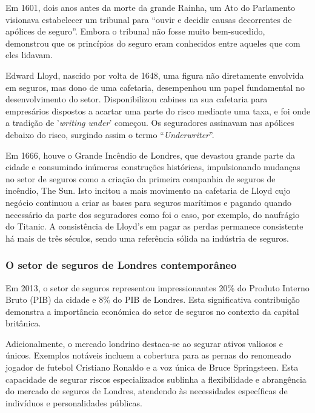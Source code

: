             Em 1601, dois anos antes da morte da grande Rainha, um Ato do Parlamento visionava estabelecer um tribunal para ``ouvir e decidir causas decorrentes de apólices de seguro''. Embora o tribunal não fosse muito bem-sucedido, demonstrou que os princípios do seguro eram conhecidos entre aqueles que com eles lidavam.
            
            Edward Lloyd, nascido por volta de 1648, uma figura não diretamente envolvida em seguros, mas dono de uma cafetaria, desempenhou um papel fundamental no desenvolvimento do setor. Disponibilizou cabines na sua cafetaria para empresários dispostos a acartar uma parte do risco mediante uma taxa, e foi onde a tradição de '\textit{writing under}' começou. Os seguradores assinavam nas apólices debaixo do risco, surgindo assim o termo ``\textit{Underwriter}''.
        
            Em 1666, houve o Grande Incêndio de Londres, que devastou grande parte da cidade e consumindo inúmeras construções históricas, impulsionando mudanças no setor de seguros como a criação da primeira companhia de seguros de incêndio, The Sun. Isto incitou a mais movimento na cafetaria de Lloyd cujo negócio continuou a criar as bases para seguros marítimos e pagando quando necessário da parte dos seguradores como foi o caso, por exemplo, do naufrágio do Titanic\cite{lloyd-titanic}. A consistência de Lloyd's em pagar as perdas permanece consistente há mais de três séculos, sendo uma referência sólida na indústria de seguros\cite{lloyds-and-the-great-fire-of-london-propertycasualty360}.

        \subsubsection{O setor de seguros de Londres contemporâneo}\label{sec:o-setor-de-seguros-de-londres-contemporaneo}
    
            Em 2013, o setor de seguros representou impressionantes 20\% do Produto Interno Bruto (PIB) da cidade e 8\% do PIB de Londres. Esta significativa contribuição demonstra a importância económica do setor de seguros no contexto da capital britânica.
            
            Adicionalmente, o mercado londrino destaca-se ao segurar ativos valiosos e únicos. Exemplos notáveis incluem a cobertura para as pernas do renomeado jogador de futebol Cristiano Ronaldo e a voz única de Bruce Springsteen. Esta capacidade de segurar riscos especializados sublinha a flexibilidade e abrangência do mercado de seguros de Londres, atendendo às necessidades específicas de indivíduos e personalidades públicas.
        

